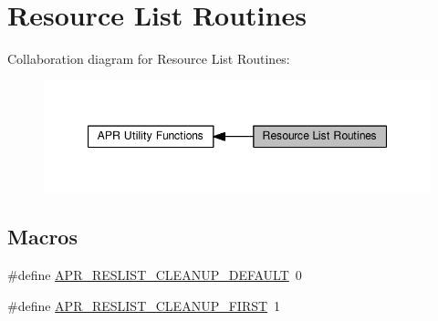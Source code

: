 \hypertarget{group__APR__Util__RL}{}\section{Resource List Routines}
\label{group__APR__Util__RL}
Collaboration diagram for Resource List Routines\+:
\nopagebreak
\begin{figure}[H]
\begin{center}
\leavevmode
\includegraphics[width=347pt]{group__APR__Util__RL}
\end{center}
\end{figure}
\subsection*{Macros}
\begin{DoxyCompactItemize}
\item 
\#define \hyperlink{group__APR__Util__RL_gae442d99e6a2eef4a4957f0360822fcac}{A\+P\+R\+\_\+\+R\+E\+S\+L\+I\+S\+T\+\_\+\+C\+L\+E\+A\+N\+U\+P\+\_\+\+D\+E\+F\+A\+U\+LT}~0
\item 
\#define \hyperlink{group__APR__Util__RL_gad93b2c229d154c8f6a5c9dfcd7488756}{A\+P\+R\+\_\+\+R\+E\+S\+L\+I\+S\+T\+\_\+\+C\+L\+E\+A\+N\+U\+P\+\_\+\+F\+I\+R\+ST}~1
\end{DoxyCompactItemize}
